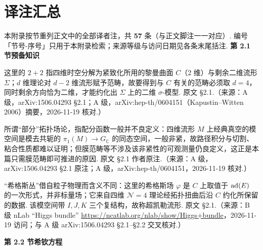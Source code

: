 \section{译注汇总}
\label{app:notes}
\noindent 本附录按节重列正文中的全部译者注，共 \textbf{57} 条（与正文脚注一一对应）. 编号「节号-序号」只用于本附录检索；来源等级与访问日期见各条末尾括注.
\begingroup\small
\medskip\noindent\textbf{第 2.1 节\quad 预备知识}\par\nopagebreak
\begin{description}[leftmargin=5.8em,labelwidth=5em,labelsep=0.6em,itemsep=0.15ex,topsep=0.2ex]
\item[2.1-1] 这里的 $2+2$ 指四维时空分解为紧致化所用的黎曼曲面 $C$（2 维）与剩余二维流形 $\Sigma$；$d$ 维理论对 $d-2$ 维流形赋予范畴，故要得到与 $C$ 有关的范畴必须取 $d=4$，同时剩余方向恰为二维，才能约化出 $\Sigma$ 上的二维 $\sigma$-模型. 原文 §2.1.（来源：A 级，arXiv:1506.04293 §2.1；A 级，arXiv:hep-th/0604151（Kapustin–Witten 2006）摘要，2026-11-19 核对.）
\item[2.1-2] 所谓“部分”拓扑场论，指配分函数一般并不良定义：四维流形 $M$ 上经典真空的模空间是模去共轭的 $\pi_1(M)\to G_{\mathbb C}$ 的同态空间，一般非紧，故路径积分与切割、粘合性质都难以证明；但膜范畴等不涉及该非紧性的可观测量仍良定义，这正是本篇只需膜范畴即可推进的原因. 原文 §2.1 作者原注.（来源：A 级，arXiv:1506.04293 §2.1 原注；A 级，arXiv:hep-th/0604151，2026-11-19 核对.）
\item[2.1-3] “希格斯丛”借自粒子物理而含义不同：这里的希格斯场 $\varphi$ 是 $C$ 上取值于 ${\mathrm{ad}(E)}$ 的一次形式，并非标量场；它来自四维 $\mathcal N=4$ 理论经拓扑扭曲后沿 $C$ 约化所保留的数据. 该模空间带 $I,J,K$ 三个复结构，故称超凯勒流形. 原文 §2.1.（来源：B 级 nLab “Higgs bundle” \url{https://ncatlab.org/nlab/show/Higgs+bundle}，2026-11-19 访问；与 A 级 arXiv:1506.04293 §2.1–§2.2 交叉核对.）
\end{description}
\medskip\noindent\textbf{第 2.2 节\quad 希钦方程}\par\nopagebreak
